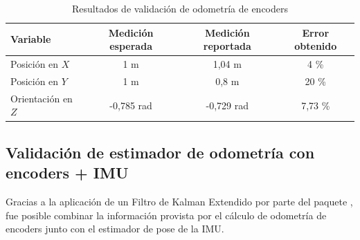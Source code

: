 \begin{table}
    \centering
    \caption[Odometria de encoders]{Resultados de validación de odometría de encoders}
    \begin{tabular}{lccc}
        \toprule
        \textbf{Variable}  & \textbf{Medición esperada} & \textbf{Medición reportada} & \textbf{Error obtenido} \\
        \midrule
        Posición en $X$    & 1 m                        & 1,04 m                      & 4 \%                    \\
        Posición en $Y$    & 1 m                        & 0,8 m                       & 20 \%                   \\
        Orientación en $Z$ & -0,785 rad                 & -0,729 rad                  & 7,73 \%                 \\
        \bottomrule
        \hline
    \end{tabular}
    \label{tab:odometriaEncoders}
\end{table}




\subsection{Validación de estimador de odometría con encoders + IMU}

Gracias a la aplicación de un Filtro de Kalman Extendido por parte del paquete , fue posible combinar la información provista por el cálculo de odometría de encoders junto con el estimador de pose de la IMU.

